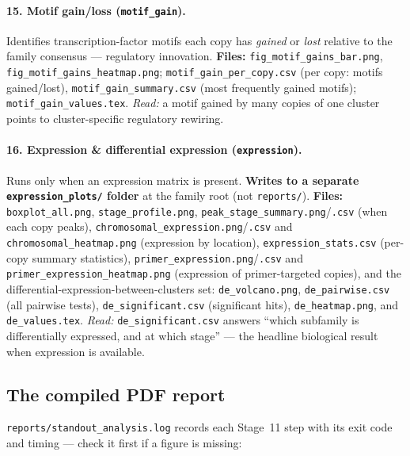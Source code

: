 \documentclass[11pt]{article}
\begin{document}
\paragraph{15. Motif gain/loss (\texttt{motif\_gain}).}
Identifies transcription-factor motifs each copy has \emph{gained} or
\emph{lost} relative to the family consensus --- regulatory innovation.
\textbf{Files:} \texttt{fig\_motif\_gains\_bar.png},
\texttt{fig\_motif\_gains\_heatmap.png};
\texttt{motif\_gain\_per\_copy.csv} (per copy: motifs gained/lost),
\texttt{motif\_gain\_summary.csv} (most frequently gained motifs);
\texttt{motif\_gain\_values.tex}.
\emph{Read:} a motif gained by many copies of one cluster points to
cluster-specific regulatory rewiring.

\paragraph{16. Expression \& differential expression (\texttt{expression}).}
Runs only when an expression matrix is present. \textbf{Writes to a
separate \texttt{expression\_plots/} folder} at the family root (not
\texttt{reports/}). \textbf{Files:} \texttt{boxplot\_all.png},
\texttt{stage\_profile.png}, \texttt{peak\_stage\_summary.png}/\texttt{.csv}
(when each copy peaks), \texttt{chromosomal\_expression.png}/\texttt{.csv}
and \texttt{chromosomal\_heatmap.png} (expression by location),
\texttt{expression\_stats.csv} (per-copy summary statistics),
\texttt{primer\_expression.png}/\texttt{.csv} and
\texttt{primer\_expression\_heatmap.png} (expression of primer-targeted
copies), and the differential-expression-between-clusters set:
\texttt{de\_volcano.png}, \texttt{de\_pairwise.csv} (all pairwise tests),
\texttt{de\_significant.csv} (significant hits), \texttt{de\_heatmap.png},
and \texttt{de\_values.tex}.
\emph{Read:} \texttt{de\_significant.csv} answers ``which subfamily is
differentially expressed, and at which stage'' --- the headline biological
result when expression is available.

\subsection{The compiled PDF report}

\texttt{reports/standout\_analysis.log} records each Stage~11 step with
its exit code and timing --- check it first if a figure is missing:
\end{document}
